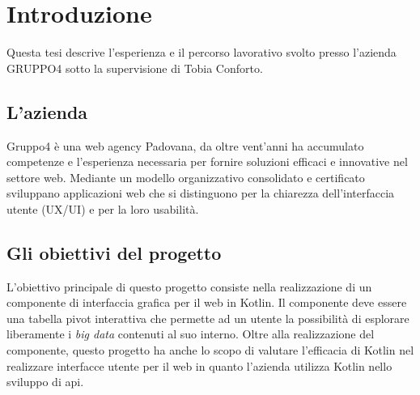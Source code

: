 
\chapter{Introduzione}
\label{cap:introduzione}

Questa tesi descrive l'esperienza e il percorso lavorativo svolto presso l'azienda GRUPPO4 sotto la supervisione di Tobia Conforto.

\section{L'azienda}
Gruppo4 è una web agency Padovana, da oltre vent'anni ha accumulato competenze e l'esperienza necessaria per fornire soluzioni efficaci e innovative nel settore web. Mediante un modello organizzativo consolidato e certificato sviluppano applicazioni web che si distinguono per la chiarezza dell'interfaccia utente (UX/UI) e per la loro usabilità.

\section{Gli obiettivi del progetto}
L'obiettivo principale di questo progetto consiste nella realizzazione di un componente di interfaccia grafica per il web in Kotlin. Il componente deve essere una tabella pivot interattiva che permette ad un utente la possibilità di esplorare liberamente i \emph{big data} contenuti al suo interno. Oltre alla realizzazione del componente, questo progetto ha anche lo scopo di valutare l'efficacia di Kotlin nel realizzare interfacce utente per il web in quanto l'azienda utilizza Kotlin nello sviluppo di \gls{api}.

